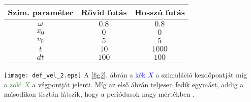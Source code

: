 \begin{multicols}{2}
\begin{center}
\begin{tabular}{c|c|c}
Szim. paraméter & Rövid futás & Hosszú futás \\
\hline \hline
$\omega$ & $0.8$ & $0.8$ \\
\hline
$x_{0}$ & $0$ & $0$ \\
\hline
$v_{0}$ & $5$ & $5$ \\
\hline
$t$ & $10$ & $1000$ \\
\hline
$dt$ & $100$ & $100$ \\
\hline
\end{tabular}
\end{center}
\label{tab3}
\hfill \break \hfill \break
{\centering\texttt{[image: def\_vel\_2.eps]}}
\label{fig2}
\hfill \break \hfill \break
A \ref{fig2}. ábrán a \textcolor{blue}{kék $X$} a szimuláció kezdőpontját míg a \textcolor{ForestGreen}{zöld $X$} a végpontját jelenti. Míg az első ábrán teljesen fedik egymást, addig a másodikon tisztán látszik, hogy a periódusok nagy mértékben .


\end{multicols}
